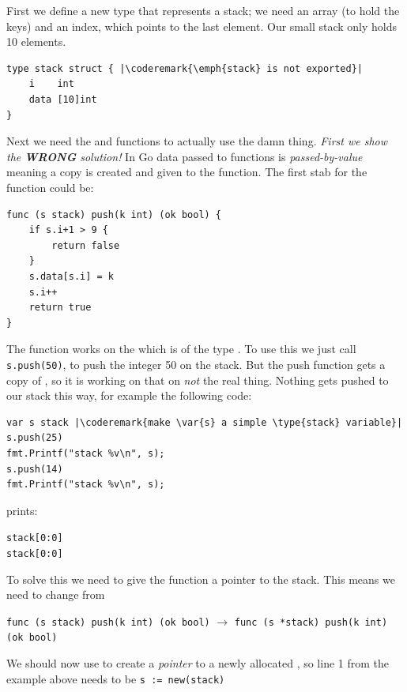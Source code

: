 \begin{Answer}

\Question 
First we define a new type that represents a stack; we need an
array (to hold the keys) and an index, which points to the last element.
Our small stack only holds 10 elements.

\begin{lstlisting}
type stack struct { |\coderemark{\emph{stack} is not exported}|
    i    int 
    data [10]int
}
\end{lstlisting}

Next we need the  and  functions to actually
use the damn thing. \emph{First we show the \textbf{WRONG} solution!}
In Go data passed to functions is \emph{passed-by-value} meaning a copy
is created and given to the function. The first stab for the function
 could be:

\begin{lstlisting}
func (s stack) push(k int) (ok bool) {
	if s.i+1 > 9 {
		return false
	}
	s.data[s.i] = k
	s.i++
	return true
}
\end{lstlisting}
The function works on the  which is of the type . To
use this we just call \lstinline{s.push(50)}, to push the integer 50 on
the stack. But the push function gets a copy of , so it is
working on that on \emph{not} the real thing. Nothing gets pushed to our
stack this way, for example the following code:

\begin{lstlisting}
var s stack |\coderemark{make \var{s} a simple \type{stack} variable}|
s.push(25)
fmt.Printf("stack %v\n", s);
s.push(14)
fmt.Printf("stack %v\n", s);
\end{lstlisting}
prints:
\begin{alltt}
stack [0:0]
stack [0:0]
\end{alltt}

To solve this we need to give the function  a pointer
to the stack. This means we need to change  from

\lstinline{func (s stack) push(k int) (ok bool)} 
$\rightarrow$
\lstinline{func (s *stack) push(k int) (ok bool)}

We should now use  to create a \emph{pointer} to a newly
allocated , so line 1 from the example above needs to be
\lstinline{s := new(stack)}


\end{Answer}
